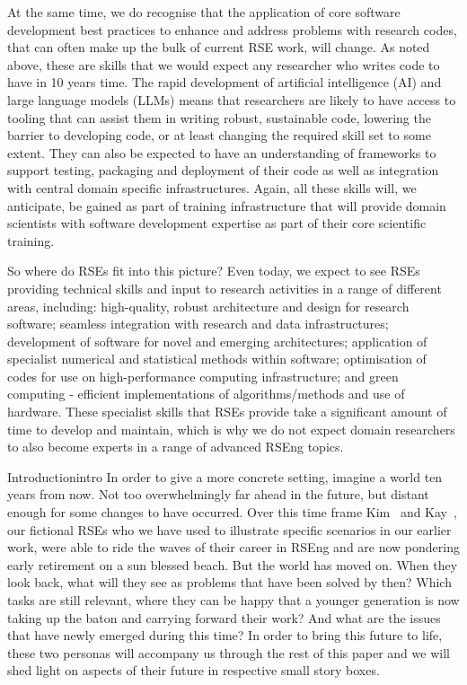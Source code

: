\documentclass{eceasst}
\begin{document}
At the same time, we do recognise that the application of core software development best practices
to enhance and address problems with research codes, that can often make up the bulk of current RSE work, will change.
As noted above, these are skills that we would expect any researcher who writes code to have in 10 years time.
The rapid development of artificial intelligence (AI) and large language models
(LLMs) means that researchers are likely to have access to tooling that can assist
them in writing robust, sustainable code, lowering the barrier to developing code,
or at least changing the required skill set to some extent.
They can also be expected to have an understanding of frameworks to support testing, packaging and
deployment of their code as well as integration with central domain specific infrastructures.
Again, all these skills will, we anticipate, be gained as part of training infrastructure that will
provide domain scientists with software development expertise as part of their core scientific training.

So where do RSEs fit into this picture?
Even today, we expect to see RSEs providing technical skills and input to research activities in a range of different areas, including:
high-quality, robust architecture and design for research software;
seamless integration with research and data infrastructures;
development of software for novel and emerging architectures;
application of specialist numerical and statistical methods within software;
optimisation of codes for use on high-performance computing infrastructure;
and green computing - efficient implementations of algorithms/methods and use of hardware.
These specialist skills that RSEs provide take a significant amount of time to develop and maintain,
which is why we do not expect domain researchers to also become experts in a range of advanced RSEng topics.


\begin{story}{Introduction}{intro}
In order to give a more concrete setting, imagine a world ten years from now.
Not too overwhelmingly far ahead in the future, but distant enough for some changes to have occurred.
Over this time frame Kim~\cite{Anzt2021} and Kay~\cite{Goth2024},
our fictional RSEs who we have used to illustrate specific scenarios in our earlier work,
were able to ride the waves of their career in RSEng and are now pondering early retirement on a sun blessed beach.
But the world has moved on.
When they look back, what will they see as problems that have been solved by then?
Which tasks are still relevant, where they can be happy that a younger generation is now taking up the baton and carrying forward their work?
And what are the issues that have newly emerged during this time?
In order to bring this future to life, these two personas will accompany us through the rest of this paper and we will shed light on aspects
of their future in respective small story boxes.
\end{story}
\end{document}
